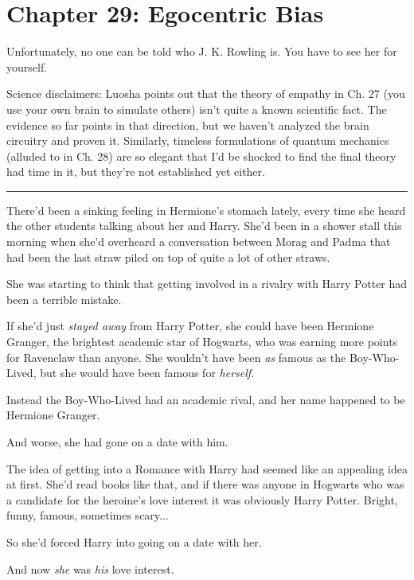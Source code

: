 \chapter{Chapter 29: Egocentric Bias}
Unfortunately, no one can be told who J. K. Rowling is. You have to see
her for yourself.

Science disclaimers: Luosha points out that the theory of empathy in Ch.
27 (you use your own brain to simulate others) isn't quite a known
scientific fact. The evidence so far points in that direction, but we
haven't analyzed the brain circuitry and proven it. Similarly, timeless
formulations of quantum mechanics (alluded to in Ch. 28) are so elegant
that I'd be shocked to find the final theory had time in it, but they're
not established yet either.

\begin{center}\rule{3in}{0.4pt}\end{center}

There'd been a sinking feeling in Hermione's stomach lately, every time
she heard the other students talking about her and Harry. She'd been in
a shower stall this morning when she'd overheard a conversation between
Morag and Padma that had been the last straw piled on top of quite a lot
of other straws.

She was starting to think that getting involved in a rivalry with Harry
Potter had been a terrible mistake.

If she'd just \emph{stayed away} from Harry Potter, she could have been
Hermione Granger, the brightest academic star of Hogwarts, who was
earning more points for Ravenclaw than anyone. She wouldn't have been
\emph{as} famous as the Boy-Who-Lived, but she would have been famous
for \emph{herself}.

Instead the Boy-Who-Lived had an academic rival, and her name happened
to be Hermione Granger.

And worse, she had gone on a date with him.

The idea of getting into a Romance with Harry had seemed like an
appealing idea at first. She'd read books like that, and if there was
anyone in Hogwarts who was a candidate for the heroine's love interest
it was obviously Harry Potter. Bright, funny, famous, sometimes
scary...

So she'd forced Harry into going on a date with her.

And now \emph{she} was \emph{his} love interest.

